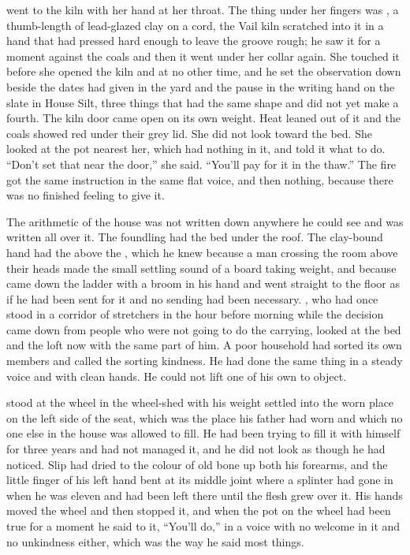 \scenebreak

 went to the kiln with her hand at her throat. The thing under her fingers was , a thumb-length of lead-glazed clay on a cord, the Vail kiln scratched into it in a hand that had pressed hard enough to leave the groove rough; he saw it for a moment against the coals and then it went under her collar again. She touched it before she opened the kiln and at no other time, and he set the observation down beside the dates  had given in the yard and the pause in the writing hand on the slate in House Silt, three things that had the same shape and did not yet make a fourth. The kiln door came open on its own weight. Heat leaned out of it and the coals showed red under their grey lid. She did not look toward the bed. She looked at the pot nearest her, which had nothing in it, and told it what to do. “Don't set that near the door,” she said. “You'll pay for it in the thaw.” The fire got the same instruction in the same flat voice, and then nothing, because there was no finished feeling to give it.

The arithmetic of the house was not written down anywhere he could see and was written all over it. The foundling had the bed under the roof. The clay-bound hand had the  above the , which he knew because a man crossing the room above their heads made the small settling sound of a board taking weight, and because  came down the ladder with a broom in his hand and went straight to the floor as if he had been sent for it and no sending had been necessary. , who had once stood in a corridor of stretchers in the hour before morning while the decision came down from people who were not going to do the carrying, looked at the bed and the loft now with the same part of him. A poor household had sorted its own members and called the sorting kindness. He had done the same thing in a steady voice and with clean hands. He could not lift one of his own to object.

\scenebreak

 stood at the wheel in the wheel-shed with his weight settled into the worn place on the left side of the seat, which was the place his father had worn and which no one else in the house was allowed to fill. He had been trying to fill it with himself for three years and had not managed it, and he did not look as though he had noticed. Slip had dried to the colour of old bone up both his forearms, and the little finger of his left hand bent at its middle joint where a splinter had gone in when he was eleven and had been left there until the flesh grew over it. His hands moved the wheel and then stopped it, and when the pot on the wheel had been true for a moment he said to it, “You'll do,” in a voice with no welcome in it and no unkindness either, which was the way he said most things.


